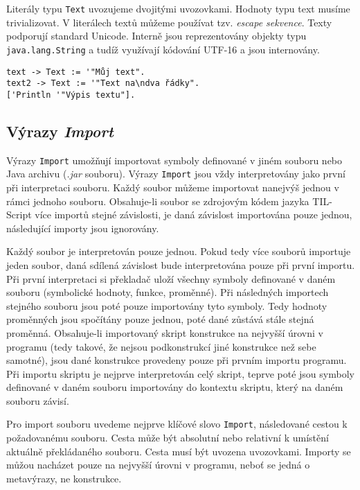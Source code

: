 Literály typu \lstinline{Text} uvozujeme dvojitými uvozovkami. Hodnoty typu text musíme
trivializovat. V literálech textů můžeme používat tzv. \textit{escape sekvence}. Texty podporují
standard Unicode. Interně jsou reprezentovány objekty typu \lstinline{java.lang.String} a tudíž
využívají kódování UTF-16 a jsou internovány.

\begin{lstlisting}[caption={Příklad využití typu Text}]
text -> Text := '"Můj text".
text2 -> Text := '"Text na\ndva řádky".
['Println '"Výpis textu"].
\end{lstlisting}

\subsection{Výrazy \textit{Import}}\label{import-statement}

Výrazy \lstinline{Import} umožňují importovat symboly definované v jiném souboru nebo Java archivu
(\textit{.jar} souboru). Výrazy \lstinline{Import} jsou vždy interpretovány jako první při
interpretaci souboru. Každý soubor můžeme importovat nanejvýš jednou v rámci jednoho souboru.
Obsahuje-li soubor se zdrojovým kódem jazyka TIL-Script více importů stejné závislosti, je daná
závislost importována pouze jednou, následující importy jsou ignorovány.

Každý soubor je interpretován pouze jednou. Pokud tedy více souborů importuje jeden soubor, daná
sdílená závislost bude interpretována pouze při první importu. Při první interpretaci si překladač
uloží všechny symboly definované v daném souboru (symbolické hodnoty, funkce, proměnné).
Při následných importech stejného souboru jsou poté pouze importovány tyto symboly. Tedy hodnoty
proměnných jsou spočítány pouze jednou, poté dané zůstává stále stejná proměnná. Obsahuje-li
importovaný skript konstrukce na nejvyšší úrovni v programu (tedy takové, že nejsou podkonstrukcí
jiné konstrukce než sebe samotné), jsou dané konstrukce provedeny pouze při prvním importu
programu. Při importu skriptu je nejprve interpretován celý skript, teprve poté jsou symboly
definované v daném souboru importovány do kontextu skriptu, který na daném souboru závisí.

Pro import souboru uvedeme nejprve klíčové slovo \lstinline{Import}, následované cestou
k požadovanému souboru. Cesta může být absolutní nebo relativní k umístění aktuálně překládaného
souboru. Cesta musí být uvozena uvozovkami. Importy se můžou nacházet pouze na nejvyšší úrovni
v programu, neboť se jedná o metavýrazy, ne konstrukce.

